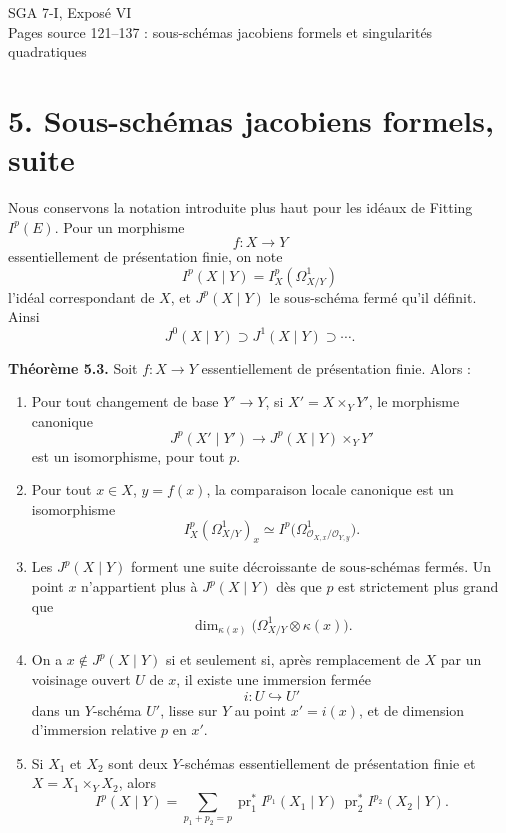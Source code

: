 \documentclass[11pt]{article}
\providecommand{\pr}{\operatorname{pr}}
\providecommand{\Oo}{\mathcal O}
\begin{document}
\begin{center}
{\Large SGA 7-I, Exposé VI}\\[0.35em]
{\large Pages source 121--137 : sous-schémas jacobiens formels et singularités quadratiques}
\end{center}

\section*{5. Sous-schémas jacobiens formels, suite}

Nous conservons la notation introduite plus haut pour les idéaux de Fitting \(I^p(E)\).  Pour un morphisme
\[
        f:X\longrightarrow Y
\]
essentiellement de présentation finie, on note
\[
        I^p(X\mid Y)=I^p_X(\Omega^1_{X/Y})
\]
l'idéal correspondant de \(X\), et \(J^p(X\mid Y)\) le sous-schéma fermé qu'il définit.  Ainsi
\[
        J^0(X\mid Y)\supset J^1(X\mid Y)\supset\cdots .
\]

\textbf{Théorème 5.3.}  Soit \(f:X\to Y\) essentiellement de présentation finie.  Alors :
\begin{enumerate}[label=(\arabic*)]
\item Pour tout changement de base \(Y'\to Y\), si \(X'=X\times_Y Y'\), le morphisme canonique
\[
        J^p(X'\mid Y')\longrightarrow J^p(X\mid Y)\times_Y Y'
\]
est un isomorphisme, pour tout \(p\).
\item Pour tout \(x\in X\), \(y=f(x)\), la comparaison locale canonique est un isomorphisme
\[
        I^p_X(\Omega^1_{X/Y})_x
        \simeq
        I^p\bigl(\Omega^1_{\Oo_{X,x}/\Oo_{Y,y}}\bigr).
\]
\item Les \(J^p(X\mid Y)\) forment une suite décroissante de sous-schémas fermés.  Un point \(x\) n'appartient plus à \(J^p(X\mid Y)\) dès que \(p\) est strictement plus grand que
\[
        \dim_{\kappa(x)}\bigl(\Omega^1_{X/Y}\otimes\kappa(x)\bigr).
\]
\item On a \(x\notin J^p(X\mid Y)\) si et seulement si, après remplacement de \(X\) par un voisinage ouvert \(U\) de \(x\), il existe une immersion fermée
\[
        i:U\hookrightarrow U'
\]
dans un \(Y\)-schéma \(U'\), lisse sur \(Y\) au point \(x'=i(x)\), et de dimension d'immersion relative \(p\) en \(x'\).
\item Si \(X_1\) et \(X_2\) sont deux \(Y\)-schémas essentiellement de présentation finie et \(X=X_1\times_YX_2\), alors
\[
        I^p(X\mid Y)
        =
        \sum_{p_1+p_2=p}
        \pr_1^*I^{p_1}(X_1\mid Y)\,
        \pr_2^*I^{p_2}(X_2\mid Y).
\]
\end{enumerate}
\end{document}
